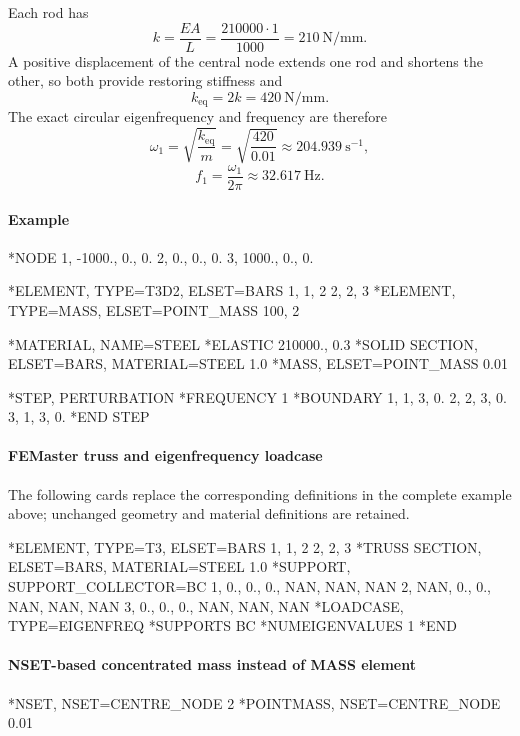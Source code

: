 Each rod has
\[
k=\frac{EA}{L}
=\frac{210000\cdot1}{1000}
=210\ \mathrm{N/mm}.
\]
A positive displacement of the central node extends one rod and shortens the other, so both provide restoring stiffness and
\[
k_\mathrm{eq}=2k=420\ \mathrm{N/mm}.
\]
The exact circular eigenfrequency and frequency are therefore
\[
\omega_1=\sqrt{\frac{k_\mathrm{eq}}{m}}
=\sqrt{\frac{420}{0.01}}
\approx204.939\ \mathrm{s}^{-1},
\]
\[
f_1=\frac{\omega_1}{2\pi}
\approx32.617\ \mathrm{Hz}.
\]

\paragraph*{Example}

\begin{inputdeck}
*NODE
1, -1000., 0., 0.
2,     0., 0., 0.
3,  1000., 0., 0.

*ELEMENT, TYPE=T3D2, ELSET=BARS
1, 1, 2
2, 2, 3
*ELEMENT, TYPE=MASS, ELSET=POINT_MASS
100, 2

*MATERIAL, NAME=STEEL
*ELASTIC
210000., 0.3
*SOLID SECTION, ELSET=BARS,
 MATERIAL=STEEL
1.0
*MASS, ELSET=POINT_MASS
0.01

*STEP, PERTURBATION
*FREQUENCY
1
*BOUNDARY
1, 1, 3, 0.
2, 2, 3, 0.
3, 1, 3, 0.
*END STEP
\end{inputdeck}

\paragraph*{FEMaster truss and eigenfrequency loadcase}

The following cards replace the corresponding definitions in the
complete example above; unchanged geometry and material definitions
are retained.

\begin{inputdeck}
*ELEMENT, TYPE=T3, ELSET=BARS
1, 1, 2
2, 2, 3
*TRUSS SECTION, ELSET=BARS, MATERIAL=STEEL
1.0
*SUPPORT, SUPPORT_COLLECTOR=BC
1, 0., 0., 0., NAN, NAN, NAN
2, NAN, 0., 0., NAN, NAN, NAN
3, 0., 0., 0., NAN, NAN, NAN
*LOADCASE, TYPE=EIGENFREQ
*SUPPORTS
BC
*NUMEIGENVALUES
1
*END
\end{inputdeck}

\paragraph*{NSET-based concentrated mass instead of MASS element}

\begin{inputdeck}
*NSET, NSET=CENTRE_NODE
2
*POINTMASS, NSET=CENTRE_NODE
0.01
\end{inputdeck}

